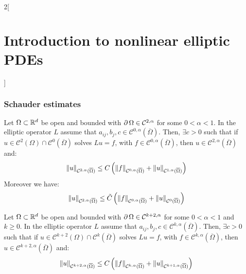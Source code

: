 \documentclass[../../../main_math.tex]{subfiles}
\begin{document}
\begin{multicols}{2}[\section{Introduction to nonlinear elliptic PDEs}]
  \subsubsection{Schauder estimates}
  \begin{theorem}
    Let $\Omega\subset \mathbb{R}^d$ be open and bounded with $\operatorname{\partial}{\Omega}\in\mathcal{C}^{2,\alpha}$ for some $0<\alpha<1$. In the elliptic operator $L$ assume that $a_{ij},b_j,c\in\mathcal{C}^{0,\alpha}(\overline{\Omega})$. Then, $\exists c>0$ such that if $u\in\mathcal{C}^2(\Omega)\cap \mathcal{C}^0(\overline{\Omega})$ solves $Lu=f$, with $f\in\mathcal{C}^{0,\alpha}(\overline{\Omega})$, then $u\in \mathcal{C}^{2,\alpha}(\overline{\Omega})$ and:
    $$
      \left\|u\right\|_{\mathcal{C}^{2,\alpha}(\overline{\Omega})}\leq C\left(\left\|f\right\|_{\mathcal{C}^{0,\alpha}(\overline{\Omega})}+\left\|u\right\|_{\mathcal{C}^{1,\alpha}(\overline{\Omega})}\right)
    $$
    Moreover we have:
    $$
      \left\|u\right\|_{\mathcal{C}^{2,\alpha}(\overline{\Omega})}\leq \tilde{C}\left(\left\|f\right\|_{\mathcal{C}^{0,\alpha}(\overline{\Omega})}+\left\|u\right\|_{\mathcal{C}^{0}(\overline{\Omega})}\right)
    $$
  \end{theorem}
  \begin{corollary}
    Let $\Omega\subset \mathbb{R}^d$ be open and bounded with $\operatorname{\partial}{\Omega}\in\mathcal{C}^{k+2,\alpha}$ for some $0<\alpha<1$ and $k\geq 0$. In the elliptic operator $L$ assume that $a_{ij},b_j,c\in\mathcal{C}^{k,\alpha}(\overline{\Omega})$. Then, $\exists c>0$ such that if $u\in\mathcal{C}^{k+2}(\Omega)\cap \mathcal{C}^k(\overline{\Omega})$ solves $Lu=f$, with $f\in\mathcal{C}^{k,\alpha}(\overline{\Omega})$, then $u\in \mathcal{C}^{k+2,\alpha}(\overline{\Omega})$ and:
    $$
      \left\|u\right\|_{\mathcal{C}^{k+2,\alpha}(\overline{\Omega})}\leq C\left(\left\|f\right\|_{\mathcal{C}^{k,\alpha}(\overline{\Omega})}+\left\|u\right\|_{\mathcal{C}^{k+1,\alpha}(\overline{\Omega})}\right)
    $$
  \end{corollary}

\end{multicols}
\end{document}
